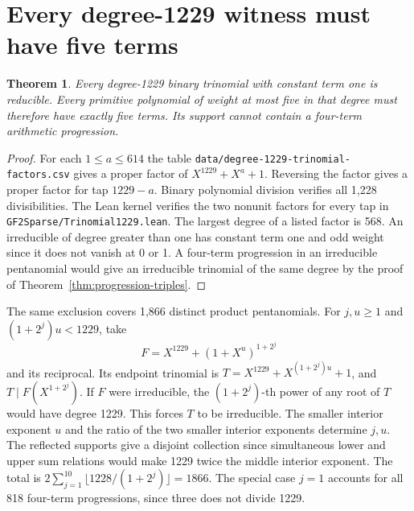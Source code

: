 \documentclass[11pt]{article}
\newtheorem{theorem}{Theorem}
\begin{document}
\section{Every degree-1229 witness must have five terms}
\begin{theorem}\label{thm:1229-no-trinomial}
Every degree-1229 binary trinomial with constant term one is reducible.
Every primitive polynomial of weight at most five in that degree must
therefore have exactly five terms. Its support cannot contain a
four-term arithmetic progression.
\end{theorem}
\begin{proof}
For each \(1\le a\le614\) the table
\nolinkurl{data/degree-1229-trinomial-factors.csv} gives a proper
factor of \(X^{1229}+X^a+1\). Reversing the factor gives a proper
factor for tap \(1229-a\). Binary polynomial division verifies all
1,228 divisibilities. The Lean kernel verifies the two nonunit factors
for every tap in \nolinkurl{GF2Sparse/Trinomial1229.lean}. The largest
degree of a listed factor is 568.
An irreducible of degree greater than one has constant term one and
odd weight since it does not vanish at 0 or 1. A four-term progression
in an irreducible pentanomial would give an irreducible trinomial of
the same degree by the proof of Theorem~\ref{thm:progression-triples}.
\end{proof}

The same exclusion covers 1,866 distinct product pentanomials. For
\(j,u\ge1\) and \((1+2^j)u<1229\), take
\[
        F=X^{1229}+(1+X^u)^{1+2^j}
\]
and its reciprocal. Its endpoint trinomial is
\(T=X^{1229}+X^{(1+2^j)u}+1\), and \(T\mid F(X^{1+2^j})\).
If \(F\) were irreducible, the \((1+2^j)\)-th power of any root of
\(T\) would have degree 1229. This forces \(T\) to be irreducible.
The smaller interior exponent \(u\) and the ratio of the two smaller
interior exponents determine \(j,u\). The reflected supports give a
disjoint collection since simultaneous lower and upper sum relations
would make 1229 twice the middle interior exponent. The total is
\(2\sum_{j=1}^{10}\lfloor1228/(1+2^j)\rfloor=1866\).
The special case \(j=1\) accounts for all 818 four-term progressions,
since three does not divide 1229.
\end{document}
